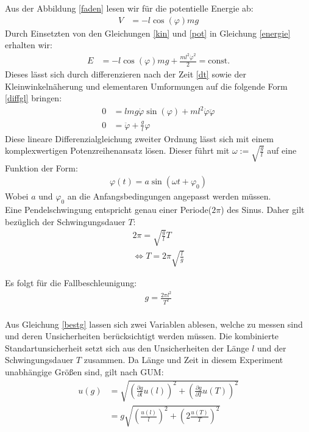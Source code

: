 Aus der Abbildung \ref{faden} lesen wir für die potentielle Energie ab:
\begin{align}
V&=-l \cos (\varphi) m g
\label{pot}
\end{align}
Durch Einsetzten von den Gleichungen \cref{kin} und \cref{pot} in Gleichung \cref{energie} erhalten wir:
\begin{align}
E&=-l \cos (\varphi) m g +\frac{ml^2\dot{\varphi}^2}{2}=\textrm{const.}
\end{align}
Dieses lässt sich durch differenzieren nach der Zeit \cref{dt} sowie der Kleinwinkelnäherung und elementaren Umformungen auf die folgende Form \cref{diffgl} bringen:
\begin{align}
	0&=lmg \dot{\varphi}\sin (\varphi) +ml^2 \dot{\varphi} \ddot{\varphi}
	\label{dt} \\
	0&=\ddot{\varphi}+\frac{g}{l} \varphi
	\label{diffgl}
\end{align}
Diese lineare Differenzialgleichung zweiter Ordnung lässt sich mit einem komplexwertigen Potenzreihenansatz lösen. Dieser führt mit $\omega:=\sqrt{\frac{g}{l}}$ auf eine Funktion der Form: 
\begin{align}
\varphi(t)=a \sin (\omega t + \varphi_0)
\end{align}
Wobei $a$ und $\varphi_0$ an die Anfangsbedingungen angepasst werden müssen.\\
Eine Pendelschwingung entspricht genau einer Periode($2\pi$) des Sinus. Daher gilt bezüglich der Schwingungsdauer $T$:
\begin{align}
	2\pi = \sqrt{\frac{g}{l}} T \\
	\Leftrightarrow T= 2 \pi \sqrt{\frac{l}{g}}
\end{align}

Es folgt für die Fallbeschleunigung:
\begin{align}
g=\frac{2 \pi l^2}{T^2}
\label{bestg}
\end{align}\\



Aus Gleichung \ref{bestg} lassen sich zwei Variablen ablesen, welche zu messen sind und deren Unsicherheiten berücksichtigt werden müssen. Die kombinierte Standartunsicherheit setzt sich aus den Unsicherheiten der Länge $l$ und der Schwingungsdauer $T$ zusammen. Da Länge und Zeit in diesem Experiment unabhängige Größen sind, gilt nach GUM:
\begin{align}
u(g)&=\sqrt{\left(\frac{\partial g}{\partial l} u(l)\right)^2 + \left(\frac{\partial g}{\partial T}u(T)\right)^2 } \\
   &= g \sqrt{\left(\frac{u(l)}{l}\right)^2+ \left(2 \frac{ u(T)}{T}\right)^2 }
   \label{kombu}
\end{align}  





